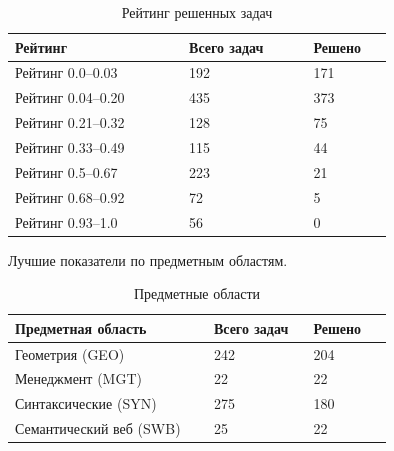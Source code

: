 \documentclass[a4paper]{report}
\begin{document}
\begin{longtable}[H]{|p{0.35\linewidth}|p{0.25\linewidth}|p{0.15\linewidth}|}
\caption{Рейтинг решенных задач}\\
\hline
\textbf{Рейтинг} & \textbf{Всего задач} & \textbf{Решено} \\
\hline
Рейтинг 0.0--0.03 & 192 & 171 \\
\hline
Рейтинг 0.04--0.20 & 435 & 373 \\
\hline
Рейтинг 0.21--0.32 & 128 & 75 \\
\hline
Рейтинг 0.33--0.49 & 115 & 44 \\
\hline
Рейтинг 0.5--0.67 & 223 & 21 \\
\hline
Рейтинг 0.68--0.92 & 72 & 5 \\
\hline
Рейтинг 0.93--1.0 & 56 & 0\\
\hline
\end{longtable}

Лучшие показатели по предметным областям.

\begin{longtable}[H]{|p{0.4\linewidth}|p{0.2\linewidth}|p{0.15\linewidth}|}
\caption{Предметные области}\\
\hline
\textbf{Предметная область} & \textbf{Всего задач} & \textbf{Решено} \\
\hline
Геометрия (GEO) & 242 & 204 \\
\hline
Менеджмент (MGT) & 22 & 22 \\
\hline
Синтаксические (SYN) & 275 & 180 \\
\hline
Семантический веб (SWB) & 25 & 22 \\
\hline
\end{longtable}


\end{document}
